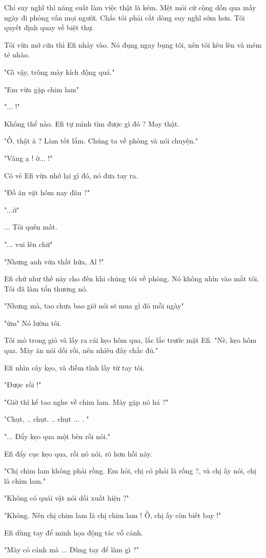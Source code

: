 Chỉ suy nghĩ thì năng suất làm việc thật là kém. Mệt mỏi cứ cộng dồn qua mấy ngày đi phỏng vấn mọi người. Chắc tôi phải cắt dòng suy nghĩ sớm hơn. Tôi quyết định quay về biệt thự.

Tôi vừa mở cửa thì Efi nhảy vào. Nó đụng ngay bụng tôi, nên tôi kêu lên và mém té nhào.

"Gì vậy, trông mày kích động quá."

"Em vừa gặp chim lam"

"... !"

Không thể nào. Efi tự mình tìm được gì đó ? May thật.

"Ồ, thật à ? Làm tốt lắm. Chúng ta về phòng và nói chuyện."

"Vâng ạ ! ờ... !"

Có vẻ Efi vừa nhớ lại gì đó, nó đưa tay ra.

"Đồ ăn vặt hôm nay đâu ?"

"...ờ"

... Tôi quên mất.

"... vui lên chứ"

"Nhưng anh vừa thất hứa, Al !"

Efi chứ như thế này cho đến khi chúng tôi về phòng. Nó không nhìn vào mắt tôi. Tôi đã làm tổn thương nó.

"Nhưng mà, tao chưa bao giờ nói sẽ mua gì đó mỗi ngày"

"ừm" Nó lườm tôi.

Tôi mò trong giỏ và lấy ra cái kẹo hôm qua, lắc lắc trước mặt Efi. "Nè, kẹo hôm qua. Mày ăn nói dối rồi, nên nhiêu đây chắc đủ."

Efi nhìn cây kẹo, và điềm tĩnh lấy từ tay tôi.

"Được rồi !"

"Giờ thì kể tao nghe về chim lam. Mày gặp nó hả ?"

"Chụt, .. chụt. .. chụt ... . "

"... Đẩy kẹo qua một bên rồi nói."

Efi đẩy cục kẹo qua, rồi nó nói, rõ hơn hồi nãy.

"Chị chim lam không phải rồng. Em hỏi, chị có phải là rồng ?, và chị ấy nói, chị là chim lam."

"Không có quái vật nói dối xuất hiện ?"

"Không. Nên chị chim lam là chị chim lam ! Ồ, chị ấy còn biết bay !"

Efi dùng tay để minh họa động tác vỗ cánh.

"Mày có cánh mà ... Dùng tay để làm gì ?"


